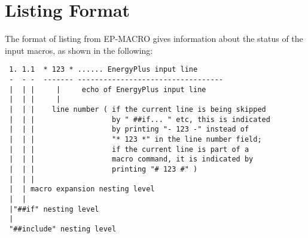 \section{Listing Format}\label{listing-format}

The format of listing from EP-MACRO gives information about the status of the input macros, as shown in the following:

\begin{lstlisting}
 1. 1.1  * 123 * ...... EnergyPlus input line
 -  - -  ------- ----------------------------------
 |  | |     |     echo of EnergyPlus input line
 |  | |     |
 |  | |    line number ( if the current line is being skipped
 |  | |                  by " ##if... " etc, this is indicated
 |  | |                  by printing "- 123 -" instead of
 |  | |                  "* 123 *" in the line number field;
 |  | |                  if the current line is part of a
 |  | |                  macro command, it is indicated by
 |  | |                  printing "# 123 #" )
 |  | |
 |  | macro expansion nesting level
 |  |
 |"##if" nesting level
 |
 "##include" nesting level
\end{lstlisting}
